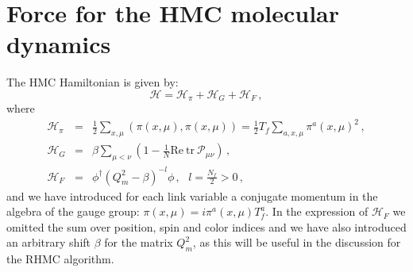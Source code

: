 \documentclass{article}[12pt]
\begin{document}
\iffalse
\section{The tree level Symanzik action}

The tree level gauge action is also implemented. It can be used by adding the flag \verb+-DTLSYM+ and read :
\begin{equation}
\mathcal{H}_G =  c_0 \beta \sum_{\mu<\nu} \left( 1- \frac{1}{N} \mathrm{Re\ tr\ } \mathcal{P}_{\mu\nu}\right) + c_1 \beta \sum_{\mu \neq \nu} \left( 1- \frac{1}{N} \mathrm{Re\ tr\ } \mathcal{P}^{1\times 2}_{\mu\nu}\right)  \, ,\\
\end{equation}

The coefficients reads $c_0=1-8 c_1$ and $c_1=-1/12$. \\

Are those coefficients representation and group independent ?

The current implementation does not work if the lattice is parallelized in 2 or more directions.  In that case, the code crashes during the execution of the function \verb+test_geometry_mpi_eo()+. The typical error message is :
\begin{verbatim}
Bad candidate index -1 for coordinates (5,7,0,10), reached from (6,7,0,10) with idn[0].
\end{verbatim}

The code crashes as well if the test function is not called.

\fi

\section{Force for the HMC molecular dynamics} \label{SHMC}
The HMC Hamiltonian is given by:
\begin{equation}
\mathcal{H}=\mathcal{H}_\pi+\mathcal{H}_G+\mathcal{H}_F \, ,
\end{equation}
where
\begin{eqnarray}
\mathcal{H}_\pi &=& \frac{1}{2} \sum_{x,\mu} ( \pi(x,\mu) , \pi(x,\mu) ) = \frac{1}{2} T_f \sum_{a,x,\mu} \pi^a(x,\mu)^2 \, ,\\
\mathcal{H}_G &=& \beta \sum_{\mu<\nu} \left( 1- \frac{1}{N} \mathrm{Re\ tr\ } \mathcal{P}_{\mu\nu}\right) \, ,\\
\mathcal{H}_F &=& \phi^\dagger ( Q_m^2 - \beta )^{-l} \phi \, , \,\,\,\, l=\frac{N_f}{2}>0 \, , \label{HF}
\end{eqnarray}
and we have introduced for each link variable a conjugate momentum in the algebra of the gauge group: $\pi(x,\mu)=i \pi^a(x,\mu) T_f^a$.
In the expression of $\mathcal{H}_F$ we omitted the sum over position, spin and color indices and we have also introduced an arbitrary shift $\beta$ for the matrix $Q_m^2$, as this will be useful in the discussion
for the RHMC algorithm.
\end{document}

